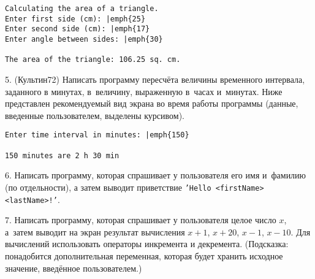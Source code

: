 \documentclass[12pt,russian,draft]{article}
\begin{document}
\begin{Verbatim}[commandchars=\|\{\}]
Calculating the area of a triangle.
Enter first side (cm): |emph{25}
Enter second side (cm): |emph{17}
Enter angle between sides: |emph{30}

The area of the triangle: 106.25 sq. cm.
\end{Verbatim}

5. (Культин72) Написать программу пересчёта величины временного интервала,
задан\-ного в минутах, в~величину, выраженную в~часах и~минутах. Ниже представлен
ре\-ко\-мен\-ду\-емый вид экрана во время работы программы (данные,
введенные пользователем, выделены курсивом).

\begin{Verbatim}[commandchars=\|\{\}]
Enter time interval in minutes: |emph{150}

150 minutes are 2 h 30 min
\end{Verbatim}

6. Написать программу, которая спрашивает у пользователя его имя и~фамилию (по
отдельности), а затем выводит приветствие \texttt{'Hello <firstName>
    <lastName>!'}.

7. Написать программу, которая спрашивает у пользователя целое число $x$,
а~затем выводит на экран результат вычисления $x+1$, $x+20$, $x-1$, $x-10$. Для
вычислений использовать операторы инкремента и декремента. (Подсказка:
понадобится дополнительная переменная, которая будет хранить исходное значение,
введённое пользователем.)
\end{document}
